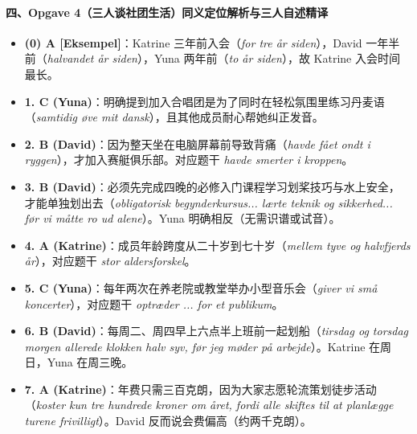 \paragraph*{四、Opgave 4（三人谈社团生活）同义定位解析与三人自述精译}
\begin{itemize}
  \item \textbf{(0) A [Eksempel]}：Katrine 三年前入会（\textit{for tre år siden}），David 一年半前（\textit{halvandet år siden}），Yuna 两年前（\textit{to år siden}），故 Katrine 入会时间最长。
  \item \textbf{1. C (Yuna)}：明确提到加入合唱团是为了同时在轻松氛围里练习丹麦语（\textit{samtidig øve mit dansk}），且其他成员耐心帮她纠正发音。
  \item \textbf{2. B (David)}：因为整天坐在电脑屏幕前导致背痛（\textit{havde fået ondt i ryggen}），才加入赛艇俱乐部。对应题干 \textit{havde smerter i kroppen}。
  \item \textbf{3. B (David)}：必须先完成四晚的必修入门课程学习划桨技巧与水上安全，才能单独划出去（\textit{obligatorisk begynderkursus... lærte teknik og sikkerhed... før vi måtte ro ud alene}）。Yuna 明确相反（无需识谱或试音）。
  \item \textbf{4. A (Katrine)}：成员年龄跨度从二十岁到七十岁（\textit{mellem tyve og halvfjerds år}），对应题干 \textit{stor aldersforskel}。
  \item \textbf{5. C (Yuna)}：每年两次在养老院或教堂举办小型音乐会（\textit{giver vi små koncerter}），对应题干 \textit{optræder ... for et publikum}。
  \item \textbf{6. B (David)}：每周二、周四早上六点半上班前一起划船（\textit{tirsdag og torsdag morgen allerede klokken halv syv, før jeg møder på arbejde}）。Katrine 在周日，Yuna 在周三晚。
  \item \textbf{7. A (Katrine)}：年费只需三百克朗，因为大家志愿轮流策划徒步活动（\textit{koster kun tre hundrede kroner om året, fordi alle skiftes til at planlægge turene frivilligt}）。David 反而说会费偏高（约两千克朗）。
\end{itemize}

